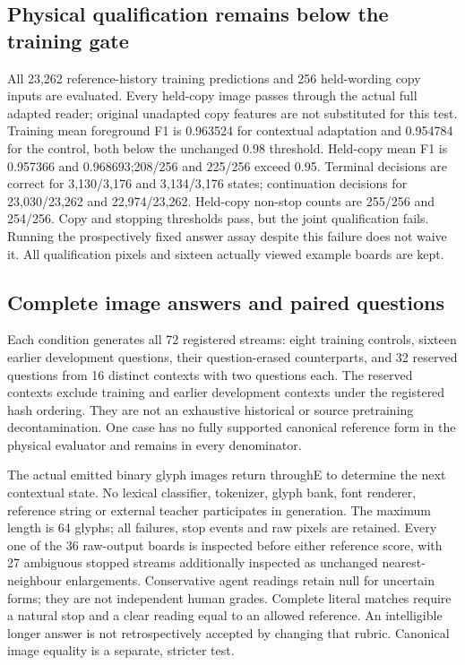 \subsection*{Physical qualification remains below the training gate}
All 23,262 reference-history training predictions and 256 held-wording copy
inputs are evaluated. Every held-copy image passes through the actual full
adapted reader; original unadapted copy features are not substituted for this
test. Training mean foreground F1 is 0.963524 for contextual adaptation and
0.954784 for the control, both below the unchanged 0.98 threshold. Held-copy
mean F1 is 0.957366 and 0.968693;208/256 and 225/256 exceed 0.95. Terminal decisions
are correct for 3,130/3,176 and 3,134/3,176 states; continuation decisions for
23,030/23,262 and 22,974/23,262. Held-copy non-stop counts are 255/256 and 254/256.
Copy and stopping thresholds pass, but the joint qualification fails. Running
the prospectively fixed answer assay despite this failure does not waive it.
All qualification pixels and sixteen actually viewed example boards are kept.

\subsection*{Complete image answers and paired questions}
Each condition generates all 72 registered streams: eight training controls,
sixteen earlier development questions, their question-erased counterparts,
and 32 reserved questions from 16 distinct contexts with two questions each.
The reserved contexts exclude training and earlier development contexts under
the registered hash ordering. They are not an exhaustive historical or source
pretraining decontamination. One case has no fully supported canonical
reference form in the physical evaluator and remains in every denominator.

The actual emitted binary glyph images return throughE to determine the next
contextual state. No lexical classifier, tokenizer, glyph bank, font renderer,
reference string or external teacher participates in generation. The maximum
length is 64 glyphs; all failures, stop events and raw pixels are retained.
Every one of the 36 raw-output boards is inspected before either reference
score, with 27 ambiguous stopped streams additionally inspected as unchanged
nearest-neighbour enlargements. Conservative agent readings retain null for
uncertain forms; they are not independent human grades. Complete literal
matches require a natural stop and a clear reading equal to an allowed
reference. An intelligible longer answer is not retrospectively accepted by
changing that rubric. Canonical image equality is a separate, stricter test.

